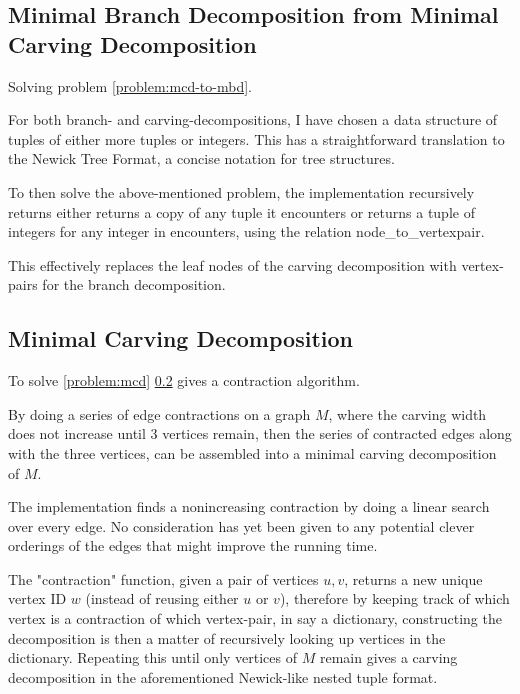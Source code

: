 \documentclass{article}
\begin{document}
	
	\subsection{Minimal Branch Decomposition from Minimal Carving Decomposition}

		Solving problem \ref{problem:mcd-to-mbd}.

		For both branch- and carving-decompositions, I have chosen a data structure of tuples of either more tuples or integers. This has a straightforward translation to the Newick Tree Format, a concise notation for tree structures.

		To then solve the above-mentioned problem, the implementation recursively returns either returns a copy of any tuple it encounters or returns a tuple of integers for any integer in encounters, using the relation node\_to\_vertexpair.

		This effectively replaces the leaf nodes of the carving decomposition with vertex-pairs for the branch decomposition.

			
	\subsection{Minimal Carving Decomposition}

		To solve \ref{problem:mcd} \ref{} gives a contraction algorithm.

		By doing a series of edge contractions on a graph $M$, where the carving width does not increase until 3 vertices remain, then the series of contracted edges along with the three vertices, can be assembled into a minimal carving decomposition of $M$.

		The implementation finds a nonincreasing contraction by doing a linear search over every edge. No consideration has yet been given to any potential clever orderings of the edges that might improve the running time.

		The "contraction" function, given a pair of vertices $u,v$, returns a new unique vertex ID $w$ (instead of reusing either $u$ or $v$), therefore by keeping track of which vertex is a contraction of which vertex-pair, in say a dictionary, constructing the decomposition is then a matter of recursively looking up vertices in the dictionary. Repeating this until only vertices of $M$ remain gives a carving decomposition in the aforementioned Newick-like nested tuple format.
\end{document}
